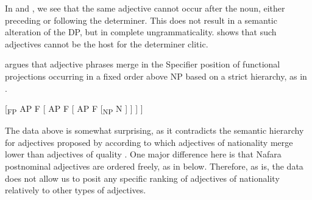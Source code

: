 \documentclass[output=paper]{langscibook}
\begin{document}
\ea\label{ex:baron:10}

 
 
\z
\z


In  and , we see that the same adjective cannot occur after the noun, either preceding or following the determiner. This does not result in a semantic alteration of the DP, but in complete ungrammaticality.  shows that such adjectives cannot be the host for the determiner clitic. 

\citet{Cinque1994} argues that adjective phrases merge in the Specifier position of functional projections occurring in a fixed order above NP based on a strict hierarchy, as in .


\ea\label{ex:baron:11}
[\textsubscript{FP}  AP  F  [  AP  F  [  AP  F  [\textsubscript{NP}  N  ] ] ] ]
\z

The data above is somewhat surprising, as it contradicts the semantic hierarchy for adjectives proposed by \citet{Cinque1994} according to which adjectives of nationality merge lower than adjectives of quality \citep[96]{Cinque1994}. One major difference here is that Nafara postnominal adjectives are ordered freely, as in  below. Therefore, as is, the data does not allow us to posit any specific ranking of adjectives of nationality relatively to other types of adjectives.
\end{document}
